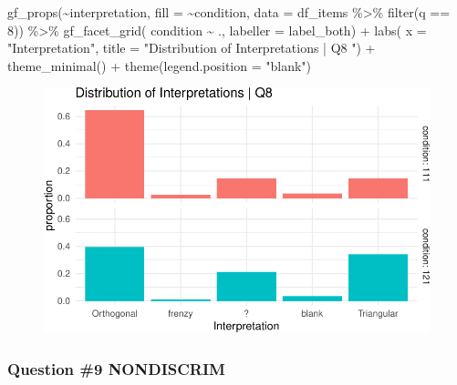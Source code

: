 \documentclass[
  letterpaper,
  DIV=11,
  numbers=noendperiod]{scrreprt}
\newenvironment{Shaded}{\begin{snugshade}}{\end{snugshade}}
\newcommand{\AttributeTok}[1]{\textcolor[rgb]{0.40,0.45,0.13}{#1}}
\newcommand{\DecValTok}[1]{\textcolor[rgb]{0.68,0.00,0.00}{#1}}
\newcommand{\FunctionTok}[1]{\textcolor[rgb]{0.28,0.35,0.67}{#1}}
\newcommand{\NormalTok}[1]{\textcolor[rgb]{0.00,0.23,0.31}{#1}}
\newcommand{\SpecialCharTok}[1]{\textcolor[rgb]{0.37,0.37,0.37}{#1}}
\newcommand{\StringTok}[1]{\textcolor[rgb]{0.13,0.47,0.30}{#1}}
\begin{document}
\begin{Shaded}
\begin{Highlighting}[]
\FunctionTok{gf\_props}\NormalTok{(}\SpecialCharTok{\textasciitilde{}}\NormalTok{interpretation, }\AttributeTok{fill =} \SpecialCharTok{\textasciitilde{}}\NormalTok{condition, }\AttributeTok{data =}\NormalTok{ df\_items }\SpecialCharTok{\%\textgreater{}\%} \FunctionTok{filter}\NormalTok{(q }\SpecialCharTok{==} \DecValTok{8}\NormalTok{)) }\SpecialCharTok{\%\textgreater{}\%} 
  \FunctionTok{gf\_facet\_grid}\NormalTok{( condition }\SpecialCharTok{\textasciitilde{}}\NormalTok{ ., }\AttributeTok{labeller =}\NormalTok{ label\_both) }\SpecialCharTok{+} 
  \FunctionTok{labs}\NormalTok{( }\AttributeTok{x =} \StringTok{"Interpretation"}\NormalTok{, }\AttributeTok{title =} \StringTok{"Distribution of Interpretations | Q8 "}\NormalTok{) }\SpecialCharTok{+} 
  \FunctionTok{theme\_minimal}\NormalTok{() }\SpecialCharTok{+} \FunctionTok{theme}\NormalTok{(}\AttributeTok{legend.position =} \StringTok{"blank"}\NormalTok{)}
\end{Highlighting}
\end{Shaded}

\begin{figure}[H]

{\centering \includegraphics{analysis/SGC3A/2_sgc3A_scoring_files/figure-pdf/Q8-distribution-2.pdf}

}

\end{figure}

\hypertarget{question-9-nondiscrim}{%
\subsubsection{Question \#9 NONDISCRIM}\label{question-9-nondiscrim}}
\end{document}
